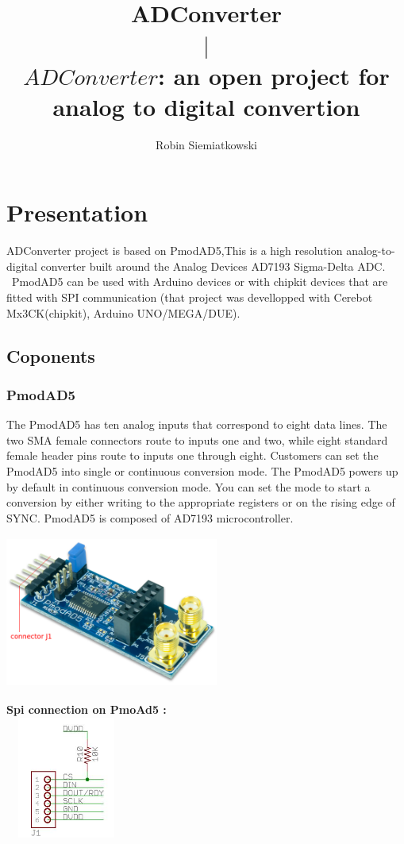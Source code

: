 \documentclass[10pt,a4paper]{report}
\title{ADConverter\\$\mid$\\$ADConverter$: an open project for\\analog to
digital convertion}
\author{Robin Siemiatkowski}
\begin{document}
\maketitle
\tableofcontents
\chapter{Presentation}
ADConverter project is based on PmodAD5,This is a high resolution analog-to-digital converter built around the Analog Devices AD7193 Sigma-Delta ADC. \ PmodAD5 can be used with Arduino devices or with chipkit devices that are fitted with SPI communication (that project was devellopped with Cerebot Mx3CK(chipkit), Arduino UNO/MEGA/DUE).
\section{Coponents}
\subsection{PmodAD5}
 
The PmodAD5 has ten analog inputs that correspond to eight data lines. The two SMA female connectors route to inputs one and two, while eight standard female header pins route to inputs one through eight.
Customers can set the PmodAD5 into single or continuous conversion mode. The PmodAD5 powers up by default in continuous conversion mode. You can set the mode to start a conversion by either writing to the appropriate registers or on the rising edge of SYNC. 
PmodAD5 is composed of AD7193 microcontroller.

\begin{center}
\includegraphics[width=7cm,height=50mm]{PmodAD5}
\end{center}

\textbf{Spi connection on PmoAd5 :}\\	
\includegraphics[width=40mm,height=40mm]{spipmodad5}
\end{document}
